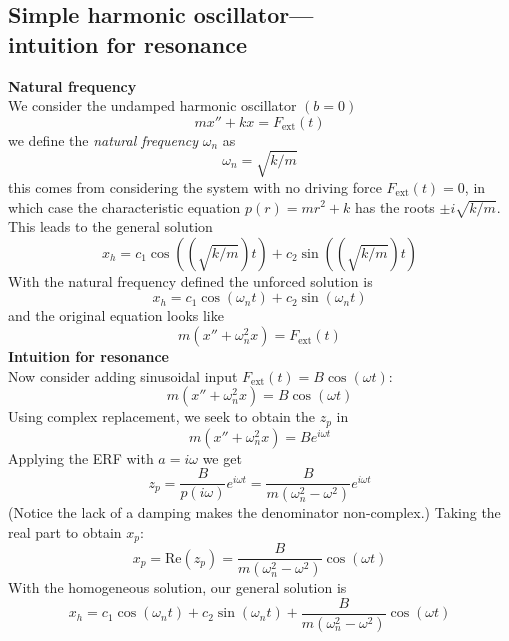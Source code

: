 \documentclass{report}
\begin{document}
\subsection{Simple harmonic oscillator---\\intuition for resonance}
\textbf{Natural frequency}\\
We consider the undamped harmonic oscillator $(b=0)$
\begin{equation*}
mx''+kx=F_{\text{ext}}(t)
\end{equation*}
we define the \textit{natural frequency} $\omega_n$ as
\begin{equation*}
\omega_n=\sqrt{k/m}
\end{equation*}
this comes from considering the system with no driving force $F_{\text{ext}}(t)=0$, in which
case the characteristic equation $p(r)=mr^2+k$ has the roots $\pm i\sqrt{k/m}$. This leads to the general solution
\begin{equation*}
x_h=c_1\cos((\sqrt{k/m})t)+c_2\sin((\sqrt{k/m})t)
\end{equation*}
With the natural frequency defined the unforced solution is
\begin{equation*}
x_h=c_1\cos(\omega_nt)+c_2\sin(\omega_nt)
\end{equation*}
and the original equation looks like
\begin{equation*}
m(x''+\omega_n^2x)=F_{\text{ext}}(t)
\end{equation*}
\textbf{Intuition for resonance}\\
Now consider adding sinusoidal input $F_{\text{ext}}(t)=B\cos(\omega t)$:
\begin{equation*}
m(x''+\omega_n^2x)=B\cos(\omega t)
\end{equation*}
Using complex replacement, we seek to obtain the $z_p$ in
\begin{equation*}
m(x''+\omega_n^2x)=Be^{i\omega t}
\end{equation*}
Applying the ERF with $a=i\omega$ we get
\begin{equation*}
z_p=\frac{B}{p(i\omega)}e^{i\omega t}=\frac{B}{m(\omega_n^2-\omega^2)}e^{i\omega t}
\end{equation*}
(Notice the lack of a damping makes the denominator non-complex.) Taking the real part to obtain $x_p$:
\begin{equation*}
x_p=\text{Re}(z_p)=\frac{B}{m(\omega_n^2-\omega^2)}\cos(\omega t)
\end{equation*}
With the homogeneous solution, our general solution is
\begin{equation*}
x_h=c_1\cos(\omega_nt)+c_2\sin(\omega_nt)+\frac{B}{m(\omega_n^2-\omega^2)}\cos(\omega t)
\end{equation*}
\end{document}
